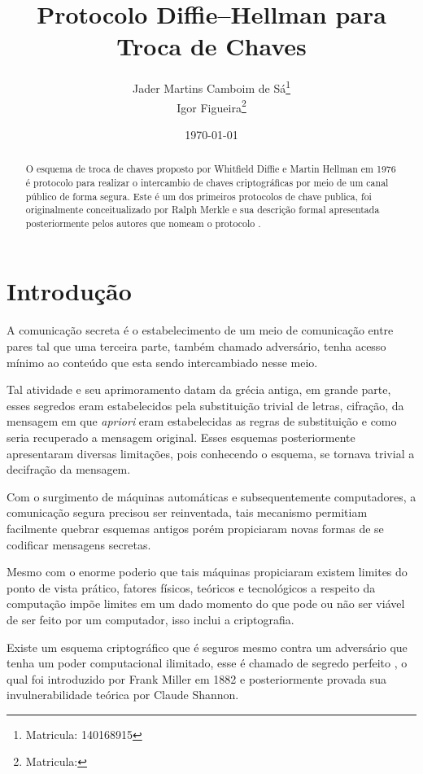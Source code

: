 \documentclass{article}
\title{Protocolo Diffie–Hellman para Troca de Chaves}
\author{Jader Martins Camboim de Sá\footnote{Matricula: 140168915}\\
        Igor Figueira\footnote{Matricula:}}
\date{\today}
\begin{document}
\maketitle

\begin{abstract}
    O esquema de troca de chaves proposto por Whitfield Diffie e
    Martin Hellman em 1976 é protocolo para realizar
    o intercambio de chaves criptográficas por meio de um canal público
    de forma segura\cite{Diffie}. Este é um dos primeiros protocolos de
    chave publica, foi originalmente conceitualizado por Ralph Merkle
    e sua descrição formal apresentada posteriormente pelos autores que
    nomeam o protocolo \cite{Merkle}.
\end{abstract}

\section{Introdução}%
\label{sec:introducao}
A comunicação secreta é o estabelecimento de um meio de comunicação entre pares
tal que uma terceira parte, também chamado adversário, tenha acesso mínimo ao
conteúdo que esta sendo intercambiado nesse meio.

Tal atividade e seu aprimoramento datam da grécia
antiga\cite{katz2014introduction}, em grande parte, esses segredos eram
estabelecidos pela substituição trivial de letras, cifração, da mensagem em que
\textit{apriori} eram estabelecidas as regras de substituição e como seria recuperado a
mensagem original. Esses esquemas posteriormente apresentaram diversas
limitações, pois conhecendo o esquema, se tornava trivial a decifração da
mensagem.

Com o surgimento de máquinas automáticas e subsequentemente computadores, a
comunicação segura precisou ser reinventada\cite{singh1999code}, tais mecanismo
permitiam facilmente quebrar esquemas antigos porém propiciaram novas formas de
se codificar mensagens secretas\cite{Diffie}.

Mesmo com o enorme poderio que tais máquinas propiciaram existem limites do
ponto de vista prático, fatores físicos, teóricos e tecnológicos a respeito da
computação impõe limites em um dado momento do que pode ou não ser viável de
ser feito por um computador, isso inclui a criptografia.

Existe um esquema criptográfico que é seguros mesmo contra um adversário que
tenha um poder computacional ilimitado, esse é chamado de segredo perfeito
\cite{katz2014introduction}, o qual foi introduzido por Frank Miller em
1882\cite{frankm} e posteriormente provada sua invulnerabilidade teórica
por Claude Shannon\cite{shannon1949communication}.
\end{document}
